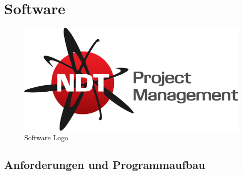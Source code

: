 \chapter{Software}
\begin{figure}[htb]
  \centering  
  \includegraphics[scale=0.5]{img/soft/logo.png}
  \caption{Software Logo}
  \label{sec:logo}
\end{figure}

\label{sec:software}
\section{Anforderungen und Programmaufbau}
